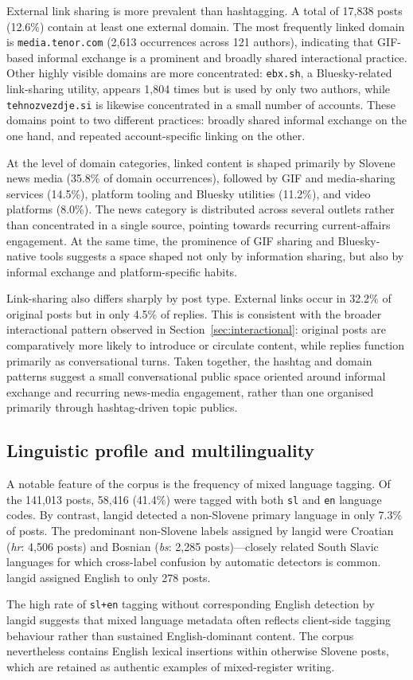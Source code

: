 External link sharing is more prevalent than hashtagging. A total of 17,838 posts (12.6\%) contain at least one external domain. The most frequently linked domain is \texttt{media.tenor.com} (2,613 occurrences across 121 authors), indicating that GIF-based informal exchange is a prominent and broadly shared interactional practice. Other highly visible domains are more concentrated: \texttt{ebx.sh}, a Bluesky-related link-sharing utility, appears 1,804 times but is used by only two authors, while \texttt{tehnozvezdje.si} is likewise concentrated in a small number of accounts. These domains point to two different practices: broadly shared informal exchange on the one hand, and repeated account-specific linking on the other.

At the level of domain categories, linked content is shaped primarily by Slovene news media (35.8\% of domain occurrences), followed by GIF and media-sharing services (14.5\%), platform tooling and Bluesky utilities (11.2\%), and video platforms (8.0\%). The news category is distributed across several outlets rather than concentrated in a single source, pointing towards recurring current-affairs engagement. At the same time, the prominence of GIF sharing and Bluesky-native tools suggests a space shaped not only by information sharing, but also by informal exchange and platform-specific habits.

Link-sharing also differs sharply by post type. External links occur in 32.2\% of original posts but in only 4.5\% of replies. This is consistent with the broader interactional pattern observed in Section~\ref{sec:interactional}: original posts are comparatively more likely to introduce or circulate content, while replies function primarily as conversational turns. Taken together, the hashtag and domain patterns suggest a small conversational public space oriented around informal exchange and recurring news-media engagement, rather than one organised primarily through hashtag-driven topic publics.

\subsection{Linguistic profile and multilinguality}

A notable feature of the corpus is the frequency of mixed language tagging. Of the 141,013 posts, 58,416 (41.4\%) were tagged with both \texttt{sl} and \texttt{en} language codes. By contrast, langid detected a non-Slovene primary language in only 7.3\% of posts. The predominant non-Slovene labels assigned by langid were Croatian (\textit{hr}: 4,506 posts) and Bosnian (\textit{bs}: 2,285 posts)---closely related South Slavic languages for which cross-label confusion by automatic detectors is common. langid assigned English to only 278 posts.

The high rate of \texttt{sl+en} tagging without corresponding English detection by langid suggests that mixed language metadata often reflects client-side tagging behaviour rather than sustained English-dominant content. The corpus nevertheless contains English lexical insertions within otherwise Slovene posts, which are retained as authentic examples of mixed-register writing.

